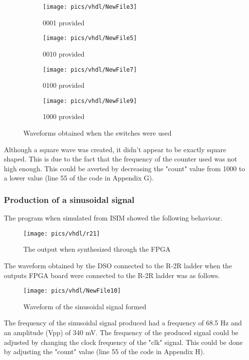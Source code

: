 \begin{figure}[!h]
	\centering
	\begin{subfigure}{.5\textwidth}
		\centering
		\texttt{[image: pics/vhdl/NewFile3]}
		\caption{0001 provided}
		\label{fig:NewFile3}
	\end{subfigure}%
	\begin{subfigure}{.5\textwidth}
		\centering
		\texttt{[image: pics/vhdl/NewFile5]}
		\caption{0010 provided}
		\label{fig:NewFile4}
	\end{subfigure}
	\begin{subfigure}{.5\textwidth}
	\centering
	\texttt{[image: pics/vhdl/NewFile7]}
	\caption{0100 provided}
	\label{fig:NewFile5}
	\end{subfigure}%
	\begin{subfigure}{.5\textwidth}
		\centering
		\texttt{[image: pics/vhdl/NewFile9]}
		\caption{1000 provided}
		\label{fig:NewFile6}
	\end{subfigure}
	\caption{Waveforms obtained when the switches were used}
	\label{fig:NewFile}
\end{figure}

\noindent
Although a square wave was created, it didn't appear to be exactly square shaped. This is due to the fact that the frequency of the counter used was not high enough. This could be averted by decreasing the "count" value from 1000 to a lower value (line 55 of the code in Appendix G).

\subsubsection{Production of a sinusoidal signal}

\noindent
The  program when simulated from ISIM showed the following behaviour. 

\begin{figure}[!h]
	\centering
	\texttt{[image: pics/vhdl/r21]}
	\caption{The output  when synthesized through the FPGA}
	\label{fig:r14}
\end{figure}

\noindent
The waveform obtained by the DSO connected to the R-2R ladder when the outputs FPGA board were connected to the R-2R ladder was as follows. 

\begin{figure}[!h]
	\centering
	\texttt{[image: pics/vhdl/NewFile10]}
	\caption{Waveform of the sinusoidal signal formed }
	\label{fig:newfile0}
\end{figure}

\noindent
The frequency of the sinusoidal  signal produced had a frequency of 68.5 Hz and an amplitude (Vpp) of 340 mV. The frequency of the produced signal could be adjusted by changing the clock frequency of the "clk" signal. This could be done by adjusting the "count" value (line 55 of the code in Appendix H).